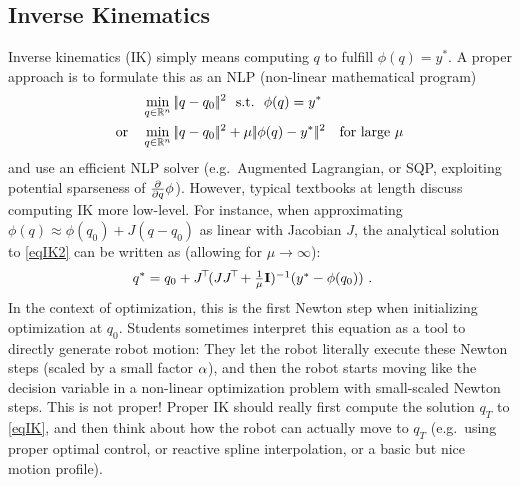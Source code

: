 \subsection{Inverse Kinematics}

Inverse kinematics (IK) simply means computing $q$ to fulfill $\phi(q) =
y^*$. A proper approach is to formulate this as an NLP (non-linear
mathematical program)
\begin{align}
&\min_{q\in{\mathbb{R}}^n} |\!|q-q_0|\!|^2 ~~\text{s.t.}~~ \phi(q) = y^* \label{eqIK}\\
\text{or}\quad&\min_{q\in{\mathbb{R}}^n} |\!|q-q_0|\!|^2 + \mu |\!|\phi(q) -
y^*|\!|^2 \quad\text{for large $\mu$} \label{eqIK2}
\end{align}
and use an efficient NLP solver (e.g.\ Augmented Lagrangian, or SQP,
exploiting potential sparseness of $\textstyle\frac{\partial}{\partial q} \phi$). However, typical
textbooks at length discuss computing IK more low-level. For instance,
when approximating $\phi(q) \approx \phi(q_0) + J (q-q_0)$ as linear
with Jacobian $J$, the analytical solution to \eqref{eqIK2} can be written
as (allowing for $\mu\to\infty$):
\begin{align}
q^*
&= q_0 +  J^{\!\top\!} (J J^{\!\top\!} + \textstyle\frac{1}{\mu} {\rm\bf I})^{-1} (y^*-\phi(q_0)) ~.
\end{align}
In the context of optimization, this is the first Newton step when
initializing optimization at $q_0$. Students sometimes interpret this
equation as a tool to directly generate robot motion: They let the
robot literally execute these Newton steps (scaled by a small factor
$\alpha$), and then the robot starts moving like the decision variable in
a non-linear optimization problem with small-scaled Newton steps. This
is not proper! Proper IK should really first compute the solution
$q_T$ to
\eqref{eqIK}, and then think about how the robot can actually move
to $q_T$ (e.g.\ using proper optimal control, or reactive spline interpolation, or
a basic but nice motion profile).




